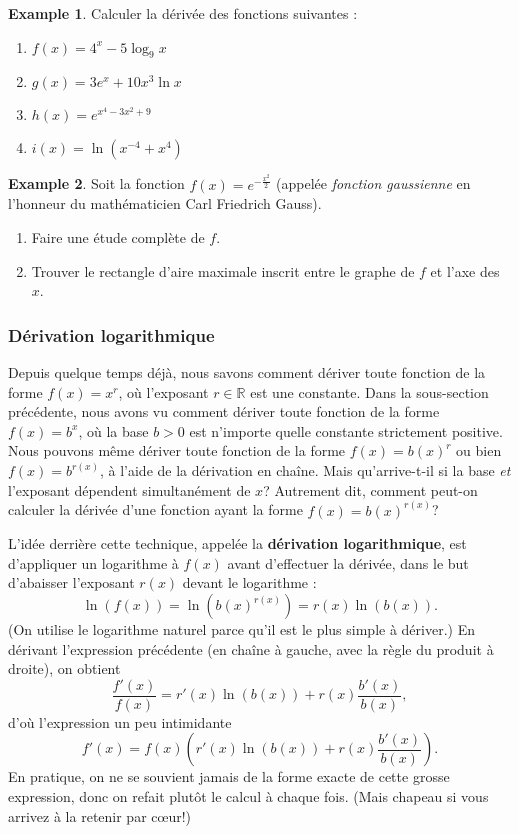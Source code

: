 \documentclass[12pt]{article}
\theoremstyle{definition}
\newtheorem{ex}{Example}
\theoremstyle{remark}
\newcommand{\R}{\mathbb{R}}
\begin{document}
\begin{ex}
    Calculer la dérivée des fonctions suivantes :
   \begin{multicols}{2}
        \begin{enumerate}
        \item $f(x) = 4^x - 5 \log_9 x$
        \item $g(x) = 3e^x + 10x^3 \ln x$
        \item $h(x) = e^{x^4 - 3x^2 + 9}$
        \item $i(x) = \ln(x^{-4} + x^4)$
    \end{enumerate}
    \end{multicols}
\end{ex}
\begin{ex}
    Soit la fonction $f(x) = e^{-\frac{x^2}{2}}$ (appelée \emph{fonction gaussienne} en l'honneur du mathématicien Carl Friedrich Gauss).
    \begin{enumerate}
        \item Faire une étude complète de $f$.
        \item Trouver le rectangle d'aire maximale inscrit entre le graphe de $f$ et l'axe des $x$.
    \end{enumerate}
\end{ex}

\subsubsection{Dérivation logarithmique}

Depuis quelque temps déjà, nous savons comment dériver toute fonction de la forme $f(x) = x^r$, où l'exposant $r \in \R$ est une constante. Dans la sous-section précédente, nous avons vu comment dériver toute fonction de la forme $f(x) = b^x$, où la base $b > 0$ est n'importe quelle constante strictement positive. Nous pouvons même dériver toute fonction de la forme $f(x) = b(x)^r$ ou bien $f(x) = b^{r(x)}$, à l'aide de la dérivation en chaîne. Mais qu'arrive-t-il si la base \emph{et} l'exposant dépendent simultanément de $x$? Autrement dit, comment peut-on calculer la dérivée d'une fonction ayant la forme $f(x) = b(x)^{r(x)}$?

L'idée derrière cette technique, appelée la \textbf{dérivation logarithmique}, est d'appliquer un logarithme à $f(x)$ avant d'effectuer la dérivée, dans le but d'abaisser l'exposant $r(x)$ devant le logarithme : \[ \ln(f(x)) = \ln(b(x)^{r(x)}) = r(x) \ln(b(x)). \] (On utilise le logarithme naturel parce qu'il est le plus simple à dériver.) En dérivant l'expression précédente (en chaîne à gauche, avec la règle du produit à droite), on obtient \[ \frac{f'(x)}{f(x)} = r'(x)\ln(b(x)) + r(x)\frac{b'(x)}{b(x)}, \] d'où l'expression un peu intimidante \[ f'(x) = f(x) \left(  r'(x)\ln(b(x)) + r(x)\frac{b'(x)}{b(x)} \right). \] En pratique, on ne se souvient jamais de la forme exacte de cette grosse expression, donc on refait plutôt le calcul à chaque fois. (Mais chapeau si vous arrivez à la retenir par cœur!)
\end{document}
